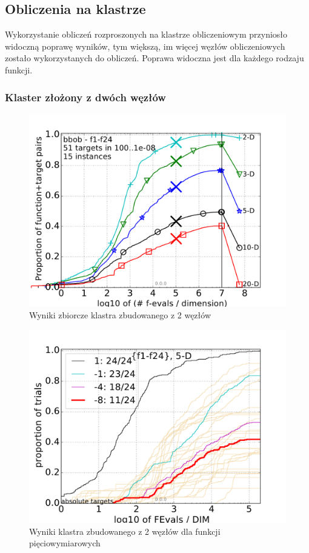 \documentclass[12pt, twoside, openany, abstract=on]{report}
\theoremstyle{definition}
\begin{document}
\subsection{Obliczenia na klastrze}
Wykorzystanie obliczeń rozproszonych na klastrze obliczeniowym przyniosło widoczną poprawę wyników, tym większą, im więcej węzłów obliczeniowych zostało wykorzystanych do obliczeń. Poprawa widoczna jest dla każdego rodzaju funkcji.

\subsubsection{Klaster złożony z dwóch węzłów}

\begin{figure}[H]
    \includegraphics[scale=1]{charts/2nodes.pdf} 
 \caption{Wyniki zbiorcze klastra zbudowanego z 2 węzłów}
\end{figure}

\begin{figure}[H]
    \includegraphics[scale=1]{charts/2nodes_5D.pdf} 
 \caption{Wyniki klastra zbudowanego z 2 węzłów dla funkcji pięciowymiarowych}
\end{figure}
\end{document}
